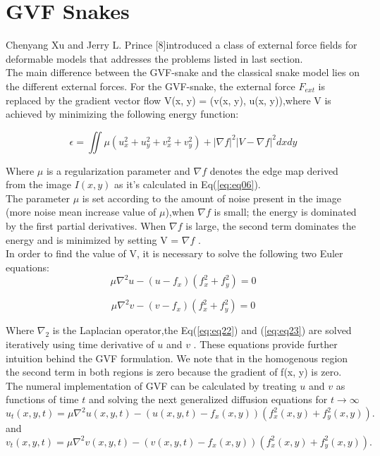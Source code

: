 \section{GVF Snakes}\label{sec:gvf-snakes}
Chenyang Xu and Jerry L. Prince [8]introduced a class of external force fields for
deformable models that addresses the problems listed in last section. \\
The main difference between the GVF-snake and the classical snake model lies
on the different external forces. For the GVF-snake, the external force $F_{ext}$ is
replaced by the gradient vector flow V(x, y) = (v(x, y), u(x, y)),where V is
achieved by minimizing the following energy function:

\begin{equation}
        \epsilon = \iint \mu (u_{x}^{2} + u_{y}^{2} + v_{x}^{2} + v_{y}^{2}) + | \nabla f |^2 |V- \nabla f |^2 dx dy
        \label{eq:eq21}
\end{equation}

\hspace{-0.6cm}Where $\mu$ is a regularization parameter and $\nabla f$ denotes the edge map
derived from the image $I(x, y)$ as it's calculated in Eq(\ref{eq:eq06}).\\
The parameter $\mu$ is set according to the amount of noise present in the image
(more noise mean increase value of $\mu$),when $\nabla f$ is small; the energy is
dominated by the first partial derivatives. When $\nabla f$ is large, the second term
dominates the energy and is minimized by setting V = $\nabla f$ \cite{2.8}.\\
In order to find the value of V, it is necessary to solve the following two Euler
equations:
\begin{equation}
        \mu \nabla^2 u - (u - f_x)(f_{x}^{2} + f_{y}^{2}) = 0
        \label{eq:eq22}
\end{equation}

\begin{equation}
        \mu \nabla^2 v - (v - f_x)(f_{x}^{2} + f_{y}^{2}) = 0
        \label{eq:eq23}
\end{equation}

\hspace{-0.6cm}Where $\nabla_2$ is the Laplacian operator,the Eq(\ref{eq:eq22}) and (\ref{eq:eq23}) are solved
iteratively using time derivative of $u$ and $v$ . These equations provide further
intuition behind the GVF formulation. We note that in the homogenous region the second term
in both regions is zero because the gradient of f(x, y) is zero.
The numeral implementation of GVF can be calculated by treating $u$ and $v$ as
functions of time $t$ and solving the next generalized diffusion equations for $ t \rightarrow \infty$
\begin{equation}
        u_t(x,y,t) = \mu \nabla^2 u(x,y,t) - (u(x,y,t) - f_x(x,y))(f_{x}^{2}(x,y) + f_{y}^{2}(x,y)).
        \label{eq:eq24}
\end{equation}
 and
\begin{equation}
        v_t(x,y,t) = \mu \nabla^2 v(x,y,t) - (v(x,y,t) - f_x(x,y))(f_{x}^{2}(x,y) + f_{y}^{2}(x,y)).
        \label{eq:eq25}
\end{equation}

